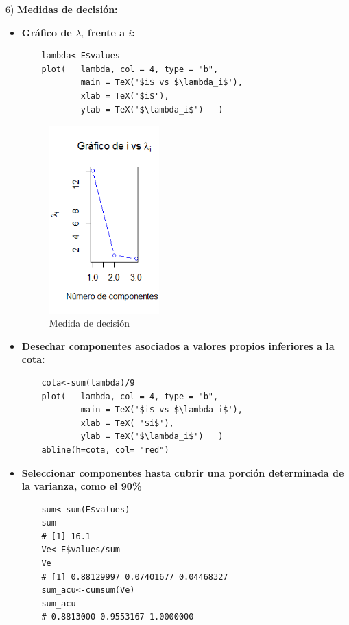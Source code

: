 \documentclass[12pt,letterpaper]{report} %
\begin{document}
6) \textbf{Medidas de decisión:}

\begin{itemize}
	\item \textbf{Gráfico de $\lambda_i$ frente a $i$:}
	
	\begin{lstlisting}
	lambda<-E$values
	plot(	lambda, col = 4, type = "b",
			main = TeX('$i$ vs $\lambda_i$'),
			xlab = TeX('$i$'),
			ylab = TeX('$\lambda_i$')	)
	\end{lstlisting}
	
	\begin{figure}
		\caption{Medida de decisión}
		\centering
		\includegraphics[width=0.4\textwidth]{img/Rplot1.png}
	\end{figure}
	
	
	\item \textbf{Desechar componentes asociados a valores propios inferiores a la cota:}
	
	\begin{lstlisting}
	cota<-sum(lambda)/9
	plot(	lambda, col = 4, type = "b", 
			main = TeX('$i$ vs $\lambda_i$'),
			xlab = TeX( '$i$'),
			ylab = TeX('$\lambda_i$')	)
	abline(h=cota, col= "red")
	\end{lstlisting}
	
	\item \textbf{Seleccionar componentes hasta cubrir una porción determinada de la
		varianza, como el 90\%}
	
	\begin{lstlisting}
	sum<-sum(E$values)
	sum
	# [1] 16.1
	Ve<-E$values/sum
	Ve
	# [1] 0.88129997 0.07401677 0.04468327
	sum_acu<-cumsum(Ve)
	sum_acu
	# 0.8813000 0.9553167 1.0000000
	\end{lstlisting}
	

\end{itemize}
\end{document}
